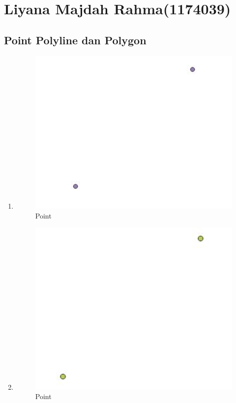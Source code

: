 \section{Liyana Majdah Rahma(1174039)}
\subsection{Point Polyline dan Polygon}
\begin{enumerate}
	\item 
	
	\begin{figure}[H]
		\includegraphics[width=12cm]{figures/1174042/No1.JPG}
		\centering
		\caption{Point}
	\end{figure}
	
	\item 
	
	\begin{figure}[H]
		\includegraphics[width=12cm]{figures/1174042/No2.JPG}
		\centering
		\caption{Point}
	\end{figure}
	

\end{enumerate}
